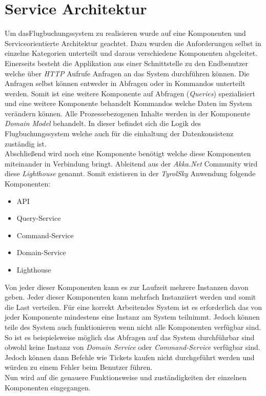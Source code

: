 \section{Service Architektur}
\label{sec:implementation:serviceAndComponentOrientation}
Um dasFlugbuchungssystem zu realisieren wurde auf eine Komponenten und Serviceorientierte Architektur geachtet. Dazu wurden die Anforderungen selbst in einzelne Kategorien unterteilt und daraus verschiedene Komponenten abgeleitet. \\
Einerseits besteht die Applikation aus einer Schnittstelle zu den Endbenutzer welche über \textit{HTTP} Aufrufe Anfragen an das System durchführen können. Die Anfragen selbst können entweder in Abfragen oder in Kommandos unterteilt werden. Somit ist eine weitere Komponente auf Abfragen (\textit{Queries}) spezialisiert und eine weitere Komponente behandelt Kommandos welche Daten im System verändern können. Alle Prozessebezogenen Inhalte werden in der Komponente \textit{Domain Model} behandelt. In dieser befindet sich die Logik des Flugbuchungssystem welche auch für die einhaltung der Datenkonsistenz zuständig ist. \\
Abschließend wird noch eine Komponente benötigt welche diese Komponenten miteinander in Verbindung bringt. Ableitend aus der \textit{Akka.Net} Community wird diese \textit{Lighthouse} genannt. Somit existieren in der \textit{TyrolSky} Anwendung folgende Komponenten:
\begin{itemize}
    \item API
    \item Query-Service
    \item Command-Service
    \item Domain-Service
    \item Lighthouse
\end{itemize}
Von jeder dieser Komponenten kann es zur Laufzeit mehrere Instanzen davon geben. 
Jeder dieser Komponenten kann mehrfach Instanziiert werden und somit die Last verteilen. Für eine korrekt Arbeitendes System ist es erforderlich das von jeder Komponente mindestens eine Instanz am System teilnimmt. Jedoch können teile des System auch funktionieren wenn nicht alle Komponenten verfügbar sind. So ist es beispielsweise möglich das Abfragen auf das System durchführbar sind obwohl keine Instanz von \textit{Domain Service} oder \textit{Command-Service} verfügbar sind. Jedoch können dann Befehle wie Tickets kaufen nicht durchgeführt werden und würden zu einem Fehler beim Benutzer führen. \\
Nun wird auf die genauere Funktionsweise und zuständigkeiten der einzelnen Komponenten eingegangen.

